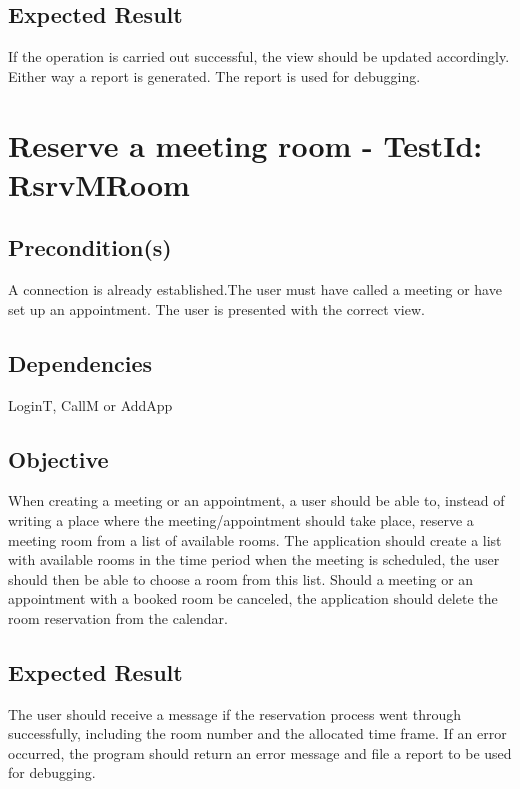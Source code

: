 \documentclass{article}
\begin{document}
\subsection{Expected Result}

If the operation is carried out successful, the view should be updated
accordingly. Either way a report is generated. The report is used for
debugging. \newpage

\section{Reserve a meeting room - TestId: RsrvMRoom}

\subsection{Precondition(s)}

A connection is already established.The user must have called a meeting or
have set up an appointment. The user is presented with the correct view.

\subsection{Dependencies}

LoginT, CallM or AddApp

\subsection{Objective}

When creating a meeting or an appointment, a user should be able to, instead
of writing a place where the meeting/appointment should take place, reserve
a meeting room from a list of available rooms. The application should create
a list with available rooms in the time period when the meeting is
scheduled, the user should then be able to choose a room from this list.
Should a meeting or an appointment with a booked room be canceled, the
application should delete the room reservation from the calendar.

\subsection{Expected Result}

The user should receive a message if the reservation process went through
successfully, including the room number and the allocated time frame. If an
error occurred, the program should return an error message and file a report
to be used for debugging. \newpage
\end{document}
